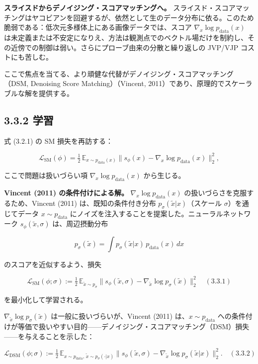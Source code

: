 \textbf{スライスドからデノイジング・スコアマッチングへ。} スライスド・スコアマッチングはヤコビアンを回避するが、依然として生のデータ分布に依る。このため脆弱である：低次元多様体上にある画像データでは、スコア $\nabla_x\log p_{\mathrm{data}}(x)$ は未定義または不安定になりえ、方法は観測点でのベクトル場だけを制約し、その近傍での制御は弱い。さらにプローブ由来の分散と繰り返しの JVP/VJP コストにも苦しむ。

ここで焦点を当てる、より頑健な代替がデノイジング・スコアマッチング（DSM, Denoising Score Matching）（Vincent, 2011）であり、原理的でスケーラブルな解を提供する。

\subsection*{3.3.2 学習}


式 (3.2.1) の SM 損失を再訪する：

\[
\mathcal{L}_{\mathrm{SM}}(\phi)
= \tfrac{1}{2}\,\mathbb{E}_{x\sim p_{\mathrm{data}}(x)}\bigl\|s_\phi(x)-\nabla_x\log p_{\mathrm{data}}(x)\bigr\|_2^2,
\]


ここで問題は扱いづらい項 $\nabla_x\log p_{\mathrm{data}}(x)$ から生じる。

\textbf{Vincent (2011) の条件付けによる解。} $\nabla_x\log p_{\mathrm{data}}(x)$ の扱いづらさを克服するため、Vincent (2011) は、既知の条件付き分布 $p_\sigma(\tilde{x}|x)$（スケール $\sigma$）を通じてデータ $x\sim p_{\mathrm{data}}$ にノイズを注入することを提案した。ニューラルネットワーク $s_\phi(\tilde{x},\sigma)$ は、周辺摂動分布

\[
p_\sigma(\tilde{x})=\int p_\sigma(\tilde{x}|x)\,p_{\mathrm{data}}(x)\,dx
\]


のスコアを近似するよう、損失

\[
\mathcal{L}_{\mathrm{SM}}(\phi;\sigma)
:= \tfrac{1}{2}\,\mathbb{E}_{\tilde{x}\sim p_\sigma}\bigl\|s_\phi(\tilde{x},\sigma)-\nabla_{\tilde{x}}\log p_\sigma(\tilde{x})\bigr\|_2^2\quad (3.3.1)
\]


を最小化して学習される。

$\nabla_{\tilde{x}}\log p_\sigma(\tilde{x})$ は一般に扱いづらいが、Vincent (2011) は、$x\sim p_{\mathrm{data}}$ への条件付けが等価で扱いやすい目的——デノイジング・スコアマッチング（DSM）損失——を与えることを示した：

\[
\mathcal{L}_{\mathrm{DSM}}(\phi;\sigma)
:= \tfrac{1}{2}\,\mathbb{E}_{x\sim p_{\mathrm{data}},\,\tilde{x}\sim p_\sigma(\cdot|x)}
\bigl\|s_\phi(\tilde{x},\sigma)-\nabla_{\tilde{x}}\log p_\sigma(\tilde{x}|x)\bigr\|_2^2.\quad (3.3.2)
\]


